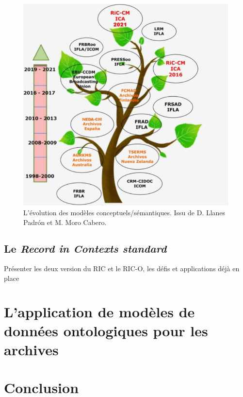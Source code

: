 \documentclass[12pt]{report}
\begin{document}
\begin{figure}[h]
    \centering
    \includegraphics[scale = 0.4]{evolution_CM.png}
    \caption {L'évolution des modèles conceptuels/sémantiques. Issu de D. Llanes Padrón et M. Moro Cabero.}
    \label{fig:enter-label}
\end{figure}
\newline
\subsection{Le \textit{Record in Contexts standard}}
Présenter les deux version du RIC et le RIC-O, les défis et applications déjà en place
\section{L'application de modèles de données ontologiques pour les archives}
\section{Conclusion}
\end{document}
